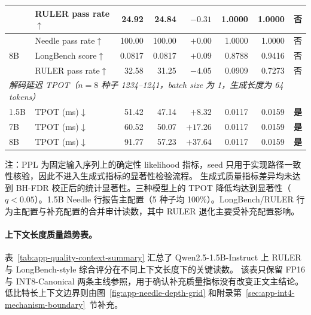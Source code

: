\begin{table}[!htbp]
\begin{tabular}{llrrrrrr}
      & RULER pass rate$\uparrow$    & 24.92  & 24.84  & $-0.31$ & 1.0000 & 1.0000 & 否 \\
    \midrule
    \multirow{3}{*}{8B}
      & Needle pass rate$\uparrow$   & 100.00 & 100.00 & $+0.00$ & 1.0000 & 1.0000 & 否 \\
      & LongBench score$\uparrow$    & 0.0817 & 0.0817 & $+0.09$ & 0.8788 & 0.9416 & 否 \\
      & RULER pass rate$\uparrow$    & 32.58  & 31.25  & $-4.05$ & 0.0909 & 0.7273 & 否 \\
    \midrule
    \multicolumn{8}{l}{\textit{解码延迟 TPOT（$n=8$ 种子 1234--1241，batch size 为 1，生成长度为 64 tokens）}} \\
    \midrule
    1.5B & TPOT (ms)$\downarrow$ & 51.42 & 47.14 & $+8.32$  & 0.0117 & 0.0159 & \textbf{是} \\
    7B   & TPOT (ms)$\downarrow$ & 60.52 & 50.07 & $+17.26$ & 0.0117 & 0.0159 & \textbf{是} \\
    8B   & TPOT (ms)$\downarrow$ & 91.77 & 57.23 & $+37.64$ & 0.0117 & 0.0159 & \textbf{是} \\
    \bottomrule
  \end{tabular}

  \vspace{2pt}
  {\footnotesize 注：PPL 为固定输入序列上的确定性 likelihood 指标，seed 只用于实现路径一致性核验，因此不进入生成式指标的显著性检验流程。
  生成式质量指标差异均未达到 BH-FDR 校正后的统计显著性。三种模型上的 TPOT 降低均达到显著性（$q < 0.05$）。1.5B Needle 行报告主配置（5 种子均 100\%）。LongBench/RULER 行为主配置与补充配置的合并审计读数，其中 RULER 退化主要受补充配置影响。}
\end{table}

\paragraph{上下文长度质量趋势表。}
\label{sec:app-quality-plots}

表~\ref{tab:app-quality-context-summary} 汇总了 Qwen2.5-1.5B-Instruct 上 RULER 与
LongBench-style 综合评分在不同上下文长度下的关键读数。
该表只保留 FP16 与 INT8-Canonical 两条主线参照，用于确认补充质量指标没有改变正文主结论。
低比特长上下文边界则由图~\ref{fig:app-needle-depth-grid}
和附录第~\ref{sec:app-int4-mechanism-boundary}~节补充。

